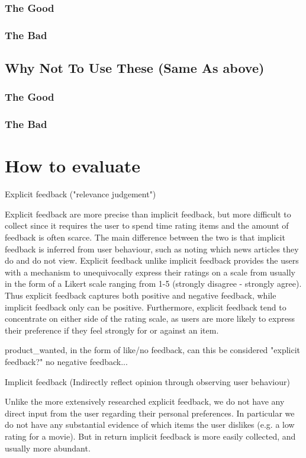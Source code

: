 \subsubsection{The Good}
\subsubsection{The Bad}
\subsection{Why Not To Use These (Same As above)}
\subsubsection{The Good}
\subsubsection{The Bad}

\section{How to evaluate}

Explicit feedback ("relevance judgement")

Explicit feedback are more precise than implicit feedback, but more difficult to collect since it requires the user to spend time rating items and the amount of feedback is often scarce. The main difference between the two is that implicit feedback is inferred from user behaviour, such as noting which news articles they do and do not view. Explicit feedback unlike implicit feedback provides the users with a mechanism to unequivocally express their ratings on a scale from usually in the form of a Likert scale ranging from 1-5 (strongly disagree - strongly agree). Thus explicit feedback captures both positive and negative feedback, while implicit feedback only can be positive. Furthermore, explicit feedback tend to concentrate on either side of the rating scale, as users are more likely to express their preference if they feel strongly for or against an item.

product\_wanted, in the form of like/no feedback, can this be considered "explicit feedback?" no negative feedback...

Implicit feedback (Indirectly reflect opinion through observing user behaviour)

Unlike the more extensively researched explicit feedback, we do not have any
direct input from the user regarding their personal preferences. In particular
we do not have any substantial evidence of which items the user dislikes (e.g. a
low rating for a movie). But in return implicit feedback is more easily
collected, and usually more abundant.

